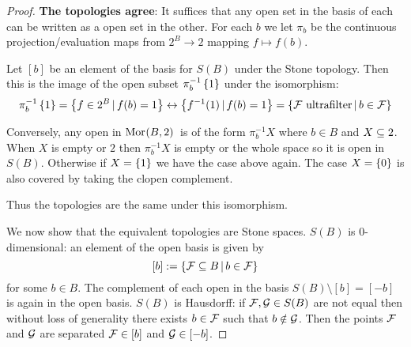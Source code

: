 \begin{proof}
    \textbf{The topologies agree}:
    It suffices that any open set in the basis of each can be written 
    as a open set in the other.
    For each $b$ we let $\pi_b$ be 
    the continuous projection/evaluation maps from $2^B \to 2$
    mapping $f \mapsto f(b)$.
    \begin{forward}
        Let $[b]$ be an element of the 
        basis for $S(B)$ under the Stone topology.
        Then this is the image of the open subset 
        $\pi_b^{-1}\left\{1\right\}$ under the isomorphism:
        \[
            \pi_b^{-1}\left\{1\right\} = \left\{f \in 2^B \,|\, f(b) = 1\right\} 
            \leftrightarrow \left\{f^{-1}(1) \,|\, f(b) = 1\right\}
            = \left\{\mathcal{F} \text{ ultrafilter} \,|\, b \in \mathcal{F}\right\}
        \]
    \end{forward}
    \begin{backward}
        Conversely, 
        any open in $\mathrm{Mor}_{}(B, 2)\,$ is of the form 
        $\pi_b^{-1}X$ where $b \in B$ and $X \subseteq 2$.
        When $X$ is empty or $2$ then $\pi_b^{-1}X$ is empty or the whole space
        so it is open in $S(B)$.
        Otherwise if $X = \left\{1\right\}$ we have the case above again.
        The case $X = \left\{0\right\}$ is also covered by taking the clopen complement.
    \end{backward}
    Thus the topologies are the same under this isomorphism.

    We now show that the equivalent topologies are Stone spaces.
    $S(B)$ is $0$-dimensional:
    an element of the open basis is given by
    \[[b] := \left\{\mathcal{F} \subseteq B \,|\, b \in \mathcal{F}\right\}\]
    for some $b \in B$.
    The complement of each open in the basis
    $S(B) \setminus [b] = [-b]$ is again in the open basis.
    $S(B)$ is Hausdorff: if $\mathcal{F}, \mathcal{G} \in S(B)$ are not equal then 
    without loss of generality there exists $b \in \mathcal{F}$ such that 
    $b \notin \mathcal{G}$. 
    Then the points $\mathcal{F}$ and $\mathcal{G}$ 
    are separated $\mathcal{F} \in [b]$ and $\mathcal{G} \in [-b]$.


\end{proof}
